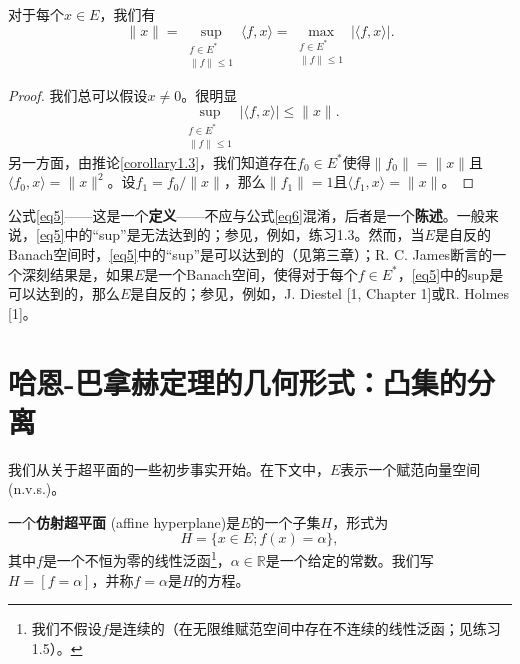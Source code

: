 \begin{corollary}\label{corollary1.4}
对于每个$x \in E$，我们有
\begin{equation}\label{eq6}
\|x\| = \sup_{\substack{f \in E^* \\ \|f\| \leq 1}} \langle f, x \rangle = \max_{\substack{f \in E^* \\ \|f\| \leq 1}} |\langle f, x \rangle|.
\end{equation}
\end{corollary}
\begin{proof}
我们总可以假设$x \neq 0$。很明显
\[ \sup_{\substack{f \in E^* \\ \|f\| \leq 1}} |\langle f, x \rangle| \leq \|x\|. \]
另一方面，由推论\ref{corollary1.3}，我们知道存在$f_0 \in E^*$使得$\|f_0\| = \|x\|$且$\langle f_0, x \rangle = \|x\|^2$。设$f_1 = f_0/\|x\|$，那么$\|f_1\| = 1$且$\langle f_1, x \rangle = \|x\|$。
\end{proof}

\begin{remark}
公式\eqref{eq5}——这是一个\textbf{定义}——不应与公式\eqref{eq6}混淆，后者是一个\textbf{陈述}。一般来说，\eqref{eq5}中的“sup”是无法达到的；参见，例如，练习1.3。然而，当$E$是自反的Banach空间时，\eqref{eq5}中的“sup”是可以达到的（见第三章）；R. C. James断言的一个深刻结果是，如果$E$是一个Banach空间，使得对于每个$f \in E^*$，\eqref{eq5}中的sup是可以达到的，那么$E$是自反的；参见，例如，J. Diestel [1, Chapter 1]或R. Holmes [1]。
\end{remark}

\section{哈恩-巴拿赫定理的几何形式：凸集的分离}
我们从关于超平面的一些初步事实开始。在下文中，$E$表示一个赋范向量空间(n.v.s.)。

\begin{definition}
一个\textbf{仿射超平面} (affine hyperplane)是$E$的一个子集$H$，形式为
\[ H = \{x \in E; f(x) = \alpha\}, \]
其中$f$是一个不恒为零的线性泛函\footnote{我们不假设$f$是连续的（在无限维赋范空间中存在不连续的线性泛函；见练习1.5）。}，$\alpha \in \mathbb{R}$是一个给定的常数。我们写$H=[f=\alpha]$，并称$f=\alpha$是$H$的方程。
\end{definition}

